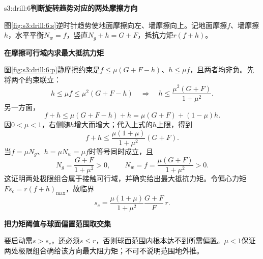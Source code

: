 \begin{drillsolution}{s3:drill:6}\textbf{判断旋转趋势对应的两处摩擦方向}\par\nobreak
图\ref{fig:s3:drill:6:s}逆时针趋势使地面摩擦向左、墙摩擦向上。记地面摩擦$f$、墙摩擦$h$，水平平衡$N_w=f$，竖直$N_g+h=G+F$，抵抗力矩$r(f+h)$。



\par\medskip{}\noindent\textbf{在摩擦可行域内求最大抵抗力矩}\par\nobreak
图\ref{fig:s3:drill:6:p}静摩擦约束是$f\le\mu(G+F-h)$、$h\le\mu f$，且两者均非负。先将两个约束联立：
\[
h\le\mu f\le\mu^2(G+F-h)
\quad\Longrightarrow\quad
h\le\frac{\mu^2(G+F)}{1+\mu^2}.
\]
另一方面，
\[
f+h\le\mu(G+F-h)+h
=\mu(G+F)+(1-\mu)h.
\]
因$0<\mu<1$，右侧随$h$增大而增大；代入上式的$h$上限，得到
\[
f+h\le\frac{\mu(1+\mu)}{1+\mu^2}(G+F).
\]
当$f=\mu N_g$、$h=\mu N_w=\mu f$时等号同时成立，且
\[
N_g=\frac{G+F}{1+\mu^2}>0,\qquad
N_w=f=\frac{\mu(G+F)}{1+\mu^2}>0.
\]
这证明两处极限组合属于接触可行域，并确实给出最大抵抗力矩。令偏心力矩$Fs_c=r(f+h)_{\max}$，故临界
\[
s_c=\frac{\mu(1+\mu)}{1+\mu^2}\frac{G+F}{F}\,r.
\]


\par\medskip{}\noindent\textbf{把力矩阈值与球面偏置范围取交集}\par\nobreak
要启动需$s>s_c$，还必须$s\le r$，否则球面范围内根本达不到所需偏置。$\mu<1$保证两处极限组合确给该方向最大阻力矩；不可不说明范围地外推。\end{drillsolution}
